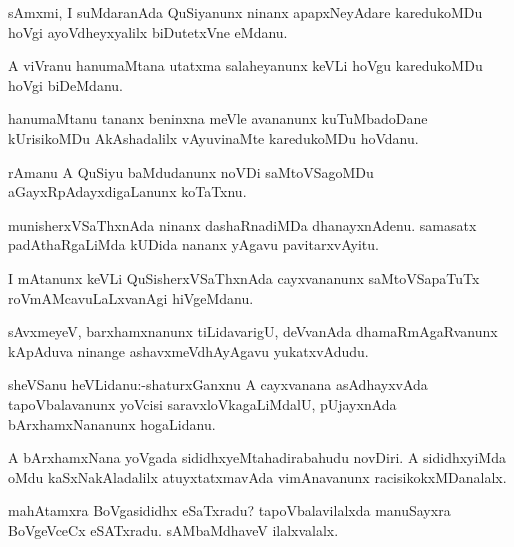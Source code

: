 \documentclass{article}
\begin{document}
\begin{mn}%
sAmxmi, I suMdaranAda QuSiyanunx ninanx apapxNeyAdare karedukoMDu hoVgi ayoVdheyxyalilx 
biDutetxVne eMdanu.
\end{mn}

\begin{mn}%
A viVranu hanumaMtana utatxma salaheyanunx keVLi hoVgu karedukoMDu hoVgi biDeMdanu.
\end{mn}

\begin{mn}%
hanumaMtanu tananx beninxna meVle avananunx kuTuMbadoDane kUrisikoMDu AkAshadalilx 
vAyuvinaMte karedukoMDu hoVdanu.
\end{mn}

\begin{mn}%
rAmanu A QuSiyu baMdudanunx noVDi saMtoVSagoMDu aGayxRpAdayxdigaLanunx koTaTxnu.
\end{mn}

\begin{mn}%
munisherxVSaThxnAda ninanx dashaRnadiMDa dhanayxnAdenu. samasatx padAthaRgaLiMda kUDida 
nananx yAgavu pavitarxvAyitu.
\end{mn}

\begin{mn}%
I mAtanunx keVLi QuSisherxVSaThxnAda cayxvananunx saMtoVSapaTuTx roVmAMcavuLaLxvanAgi 
hiVgeMdanu.
\end{mn}

\begin{mn}%
sAvxmeyeV, barxhamxnanunx tiLidavarigU, deVvanAda dhamaRmAgaRvanunx kApAduva ninange 
ashavxmeVdhAyAgavu yukatxvAdudu.
\end{mn}


\begin{mn}%
sheVSanu heVLidanu:-shaturxGanxnu A cayxvanana asAdhayxvAda tapoVbalavanunx yoVcisi 
saravxloVkagaLiMdalU, pUjayxnAda bArxhamxNananunx hogaLidanu.
\end{mn}

\begin{mn}%
A bArxhamxNana yoVgada sididhxyeMtahadirabahudu novDiri. A sididhxyiMda oMdu 
kaSxNakAladalilx atuyxtatxmavAda vimAnavanunx racisikokxMDanalalx.
\end{mn}

\begin{mn}%
mahAtamxra BoVgasididhx eSaTxradu? tapoVbalavilalxda manuSayxra BoVgeVceCx eSATxradu. 
sAMbaMdhaveV ilalxvalalx.
\end{mn}
\end{document}
